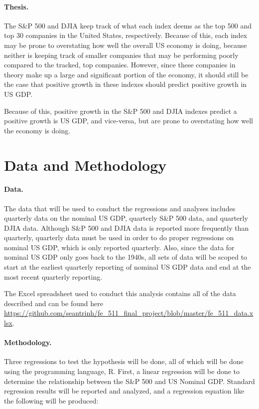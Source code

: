 \documentclass[11pt]{article}
\numberwithin{equation}{section}
\begin{document}
\paragraph{Thesis.}
The S\&P 500 and DJIA keep track of what each index deems as the top 500 and top 30 companies in the United States, respectively. Because of this, each index may be prone to overstating how well the overall US economy is doing, because neither is keeping track of smaller companies that may be performing poorly compared to the tracked, top companies. However, since these companies in theory make up a large and significant portion of the economy, it should still be the case that positive growth in these indexes should predict positive growth in US GDP.

Because of this, positive growth in the S\&P 500 and DJIA indexes predict a positive growth is US GDP, and vice-versa, but are prone to overstating how well the economy is doing.

\section{Data and Methodology}

\paragraph{Data.} 
The data that will be used to conduct the regressions and analyses includes quarterly data on the nominal US GDP, quarterly S\&P 500 data, and quarterly DJIA data. Although S\&P 500 and DJIA data is reported more frequently than quarterly, quarterly data must be used in order to do proper regressions on nominal US GDP, which is only reported quarterly. Also, since the data for nominal US GDP only goes back to the 1940s, all sets of data will be scoped to start at the earliest quarterly reporting of nominal US GDP data and end at the most recent quarterly reporting.

The Excel spreadsheet used to conduct this analysis contains all of the data described and can be found here \url{https://github.com/seantrinh/fe_511_final_project/blob/master/fe_511_data.xlsx}.

\paragraph{Methodology.}
Three regressions to test the hypothesis will be done, all of which will be done using the programming language, R. First, a linear regression will be done to determine the relationship between the S\&P 500 and US Nominal GDP. Standard regression results will be reported and analyzed, and a regression equation like the following will be produced:
\end{document}
